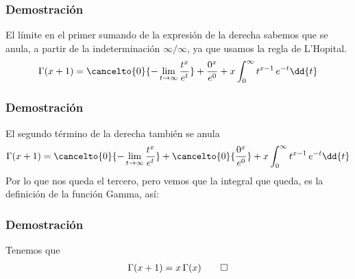 \begin{frame}
\frametitle{Demostración}
El límite en el primer sumando de la expresión de la derecha sabemos que se anula, a partir de la indeterminación $\infty / \infty$, ya que usamos la regla de L'Hopital.
\begin{align*}
\Gamma (x + 1) = \cancelto{0}{- \lim_{t \to \infty} \dfrac{t^{x}}{e^t}} + \dfrac{0^{x}}{e^{0}} + x \int_{0}^{\infty} t^{x-1} \, e^{-t} \dd{t}
\end{align*}
\end{frame}
\begin{frame}
\frametitle{Demostración}
El segundo término de la derecha también se anula
\begin{align*}
\Gamma (x + 1) = \cancelto{0}{- \lim_{t \to \infty} \dfrac{t^{x}}{e^t}} + \cancelto{0}{\dfrac{0^{x}}{e^{0}}} + x \int_{0}^{\infty} t^{x-1} \, e^{-t} \dd{t}
\end{align*}
\pause
Por lo que nos queda el tercero, pero vemos que la integral que queda, es la definición de la función Gamma, así:
\end{frame}
\begin{frame}
\frametitle{Demostración}
Tenemos que
\begin{align}
\Gamma (x + 1) = x \, \Gamma (x) \qed
\label{eq:ecuacion_01_04_01}
\end{align}
\end{frame}
